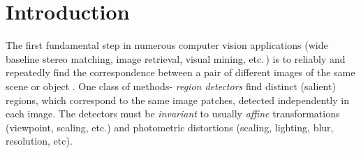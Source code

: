 \documentclass[conference,compsoc]{IEEEtran}
\begin{document}




%
\IEEEpeerreviewmaketitle


\section{Introduction}
\label{sec:intro}
The first fundamental step in numerous computer vision applications (wide baseline stereo matching, image retrieval, visual mining, etc.\,) is to reliably and repeatedly find the correspondence between a pair of different images of the same scene or object \cite{Matas2002BMVC, Rodriguez2013, EscaleraCVPR07}. One class of methods- {\em region detectors} find distinct (salient) regions, which correspond to the same image patches, detected independently in each image. The detectors must be {\em invariant} to usually {\em affine} transformations (viewpoint, scaling, etc.) and photometric distortions (scaling, lighting, blur, resolution, etc). 
\end{document}
